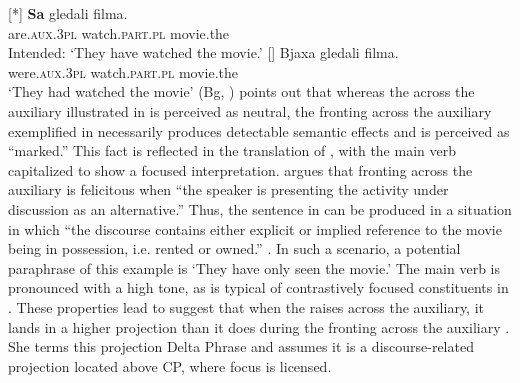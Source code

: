 \documentclass[output=paper,modfonts,newtxmath,hidelinks]{langscibook}
\begin{document}
\ea \label{11:ex17}
	\label{11:ex17a}
	{\gll
		 	 \textbf{Sa} gledali filma.\\
             are.\textsc{aux.3pl} watch.\textsc{part.pl} movie.the\\
		\glt Intended: `They have watched the movie.'
	}\label{11:ex17a2}
	\label{11:ex17b}
	[]{
		\gll	 Bjaxa gledali filma.\\
        were.\textsc{aux.3pl} watch.\textsc{part.pl} movie.the\\
		\glt `They had watched the movie' \hfill (Bg, \citealt[111--112]{lambova2003})
	}\label{11:ex17b2}
	\z
\z
\citet{lambova2003} points out that whereas the  across the auxiliary  illustrated in  is perceived as neutral, the fronting across the  auxiliary exemplified in  necessarily produces detectable semantic effects and is perceived as “marked.” This fact is reflected in the translation of , with the main verb capitalized to show a focused interpretation. \citet[113]{lambova2003} argues that  fronting across the  auxiliary is felicitous when “the speaker is presenting the activity under discussion as an alternative.” Thus, the sentence in  can be produced in a situation in which “the discourse contains either explicit or implied reference to the movie being in possession, i.e. rented or owned.” \citep[113]{lambova2003}. In such a scenario, a potential paraphrase of this example is `They have only seen the movie.' The main verb is pronounced with a high tone, as is typical of contrastively focused constituents in . These properties lead \citeauthor{lambova2003} to suggest that when the  raises across the  auxiliary, it lands in a higher projection than it does during the fronting across the auxiliary . She terms this projection Delta Phrase and assumes it is a discourse-related projection located above CP, where focus is licensed.
\end{document}
